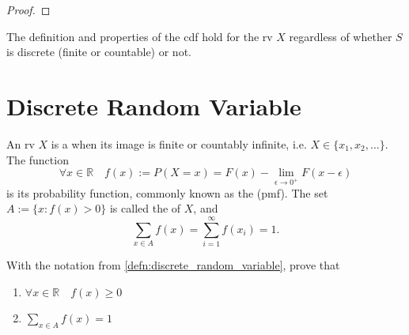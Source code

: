 \documentclass[notoc,notitlepage]{tufte-book}
\begin{document}
\begin{proof}
\end{proof}

\begin{note}
  The definition and properties of the cdf hold for the rv $X$ regardless of whether $S$ is discrete (finite or countable) or not.
\end{note}


\section{Discrete Random Variable} %
\label{sec:discrete_random_variable}

\begin{defn}\label{defn:discrete_random_variable}
  An rv $X$ is a  when its image is finite or countably infinite, i.e. $X \in \{x_1, x_2, ...\}$. The function
  \begin{equation*}
    \forall x \in \mathbb{R} \quad f(x) := P(X = x) = F(x) - \lim_{\epsilon \to 0^+} F(x - \epsilon)
  \end{equation*}
  is its probability function, commonly known as the  (pmf). The set $A := \{x : f(x) > 0\}$ is called the  of $X$, and
  \begin{equation}\label{eq:defn_discrete_rv_prob_sum}
    \sum_{x \in A} f(x) = \sum_{i=1}^{\infty} f(x_i) = 1.
  \end{equation}
\end{defn}

\begin{propo}\label{propo:properties_of_pmf}
  With the notation from \cref{defn:discrete_random_variable}, prove that
  \begin{enumerate}
    \item $\forall x \in \mathbb{R} \quad f(x) \geq 0$
    \item $\sum_{x \in A} f(x) = 1$
  \end{enumerate}
\end{propo}
\end{document}
